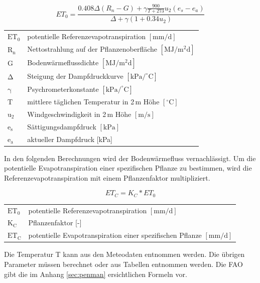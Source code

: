 \begin{equation}
\label{eq:penman_ref}
ET_0=\frac{0.408\Delta \left(R_n-G\right)+\gamma \frac{900}{T+273}u_2\left(e_s-e_a\right)}{\Delta +\gamma\left(1+0.34u_2\right)}
\end{equation}
\begin{table}[H]
\centering
\begin{tabular}{ll}
$\mathrm{ET_0}$ & potentielle Referenzevapotranspiration $\mathrm{[mm/d]}$\\
$\mathrm{R_n}$ & Nettostrahlung auf der Pflanzenoberfläche $\mathrm{[MJ/m^2d]}$ \\
$\mathrm{G}$ & Bodenwärmeflussdichte $\mathrm{[MJ/m^2d]}$\\
$\mathrm{\Delta}$ & Steigung der Dampfdruckkurve $\mathrm{[kPa/^{\circ}C]}$\\
$\mathrm{\gamma}$ & Psychrometerkonstante $\mathrm{[kPa/^{\circ}C]}$\\
$\mathrm{T}$ & mittlere täglichen Temperatur in 2\,m Höhe $\mathrm{[^{\circ}C]}$\\
$\mathrm{u_2}$ & Windgeschwindigkeit in 2\,m Höhe $\mathrm{[m/s]}$\\
$\mathrm{e_s}$ & Sättigungsdampfdruck $\mathrm{[kPa]}$\\
$\mathrm{e_a}$ & aktueller Dampfdruck [kPa]\\
\end{tabular}
\end{table}

In den folgenden Berechnungen wird der Bodenwärmefluss vernachlässigt. Um die potentielle Evapotranspiration einer spezifischen Pflanze zu bestimmen, wird die Referenzevapotranspiration mit einem Pflanzenfaktor multipliziert.

\begin{equation}
\label{eq:penman_spez}
ET_C=K_C*ET_0
\end{equation}
\begin{table}[H]
\centering
\begin{tabular}{ll}
$\mathrm{ET_0}$ & potentielle Referenzevapotranspiration $\mathrm{[mm/d]}$\\
$\mathrm{K_C}$ & Pflanzenfaktor [-]\\
$\mathrm{ET_C}$ & potentielle Evapotranspiration einer spezifischen Pflanze $\mathrm{[mm/d]}$\\
\end{tabular}
\end{table}

Die Temperatur T kann aus den Meteodaten entnommen werden. Die übrigen Parameter müssen berechnet oder aus Tabellen entnommen werden. Die FAO\,\cite{fao} gibt die im Anhang \ref{sec:penman} ersichtlichen Formeln vor.


